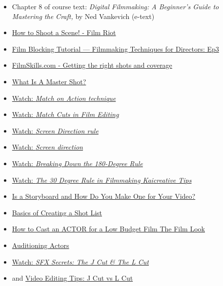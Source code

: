\documentclass[
  letterpaper,
  DIV=11,
  numbers=noendperiod]{scrreprt}
\providecommand{\tightlist}{%
  \setlength{\itemsep}{0pt}\setlength{\parskip}{0pt}}\usepackage{longtable,booktabs,array}
\begin{document}
\begin{itemize}
\tightlist
\item
  Chapter 8 of course text: \emph{Digital Filmmaking: A Beginner's Guide
  to Mastering the Craft,} by Ned Vankevich (e-text)
\item
  \href{https://www.youtube.com/watch?v=IK2IAEO-FUI}{How to Shoot a
  Scene! - Film Riot}
\item
  \href{https://www.youtube.com/watch?v=9AGaECt9j4g}{Film Blocking
  Tutorial --- Filmmaking Techniques for Directors: Ep3}
\item
  \href{https://www.youtube.com/watch?v=okphB85lfjk}{FilmSkills.com -
  Getting the right shots and coverage}
\item
  \href{https://www.youtube.com/watch?v=cz3nBkIa9K0}{What Is A Master
  Shot?}
\item
  \href{https://www.youtube.com/watch?v=eou7A-e2e4I}{Watch: \emph{Match
  on Action technique}}
\item
  \href{https://www.youtube.com/watch?v=El28XrjtcMI}{Watch: \emph{Match
  Cuts in Film Editing}}
\item
  \href{https://www.youtube.com/watch?v=9XOn5uxdSJc}{Watch: \emph{Screen
  Direction rule}}
\item
  \href{https://www.youtube.com/watch?v=RogoUz_pk4Y}{Watch: \emph{Screen
  direction}}
\item
  \href{https://www.youtube.com/watch?v=HinUychY3sE}{Watch:
  \emph{Breaking Down the 180-Degree Rule}}
\item
  \href{https://www.youtube.com/watch?v=1K8EUc98VoQ}{Watch: \emph{The 30
  Degree Rule in Filmmaking \textbar{} Kaicreative \textbar{} Tips}}
\item
  \href{https://www.wyzowl.com/what-is-a-storyboard/What}{Is a
  Storyboard and How Do You Make One for Your Video?}
\item
  \href{https://www.youtube.com/watch?v=-rzJP_5L_yQ}{Basics of Creating
  a Shot List}
\item
  \href{https://www.youtube.com/watch?v=YpCkRPqsiJ4}{How to Cast an
  ACTOR for a Low Budget Film \textbar{} The Film Look}
\item
  \href{https://www.youtube.com/watch?v=x0G6n346m90}{Auditioning Actors}
\item
  \href{https://www.youtube.com/watch?v=eyH-a964kAs}{Watch: \emph{SFX
  Secrets: The J Cut \& The L Cut}}
\item
  and \href{https://www.youtube.com/watch?v=fT5rRPMnka0}{Video Editing
  Tips: J Cut vs L Cut}
\end{itemize}
\end{document}
